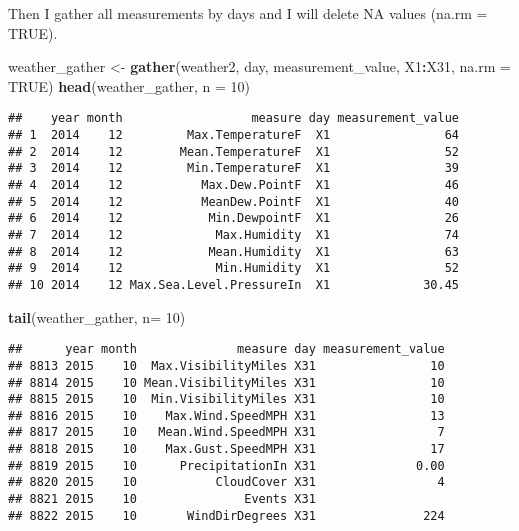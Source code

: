 \documentclass[
]{article}
\newenvironment{Shaded}{\begin{snugshade}}{\end{snugshade}}
\newcommand{\DataTypeTok}[1]{\textcolor[rgb]{0.13,0.29,0.53}{#1}}
\newcommand{\DecValTok}[1]{\textcolor[rgb]{0.00,0.00,0.81}{#1}}
\newcommand{\KeywordTok}[1]{\textcolor[rgb]{0.13,0.29,0.53}{\textbf{#1}}}
\newcommand{\NormalTok}[1]{#1}
\newcommand{\OperatorTok}[1]{\textcolor[rgb]{0.81,0.36,0.00}{\textbf{#1}}}
\newcommand{\OtherTok}[1]{\textcolor[rgb]{0.56,0.35,0.01}{#1}}
\newcommand{\StringTok}[1]{\textcolor[rgb]{0.31,0.60,0.02}{#1}}
\begin{document}
Then I gather all measurements by days and I will delete NA values
(na.rm = TRUE).

\begin{Shaded}
\begin{Highlighting}[]
\NormalTok{weather_gather <-}\StringTok{ }\KeywordTok{gather}\NormalTok{(weather2, day, measurement_value, X1}\OperatorTok{:}\NormalTok{X31, }\DataTypeTok{na.rm =} \OtherTok{TRUE}\NormalTok{)}
\KeywordTok{head}\NormalTok{(weather_gather, }\DataTypeTok{n =} \DecValTok{10}\NormalTok{)}
\end{Highlighting}
\end{Shaded}

\begin{verbatim}
##    year month                  measure day measurement_value
## 1  2014    12         Max.TemperatureF  X1                64
## 2  2014    12        Mean.TemperatureF  X1                52
## 3  2014    12         Min.TemperatureF  X1                39
## 4  2014    12           Max.Dew.PointF  X1                46
## 5  2014    12           MeanDew.PointF  X1                40
## 6  2014    12            Min.DewpointF  X1                26
## 7  2014    12             Max.Humidity  X1                74
## 8  2014    12            Mean.Humidity  X1                63
## 9  2014    12             Min.Humidity  X1                52
## 10 2014    12 Max.Sea.Level.PressureIn  X1             30.45
\end{verbatim}

\begin{Shaded}
\begin{Highlighting}[]
\KeywordTok{tail}\NormalTok{(weather_gather, }\DataTypeTok{n=} \DecValTok{10}\NormalTok{)}
\end{Highlighting}
\end{Shaded}

\begin{verbatim}
##      year month              measure day measurement_value
## 8813 2015    10  Max.VisibilityMiles X31                10
## 8814 2015    10 Mean.VisibilityMiles X31                10
## 8815 2015    10  Min.VisibilityMiles X31                10
## 8816 2015    10    Max.Wind.SpeedMPH X31                13
## 8817 2015    10   Mean.Wind.SpeedMPH X31                 7
## 8818 2015    10    Max.Gust.SpeedMPH X31                17
## 8819 2015    10      PrecipitationIn X31              0.00
## 8820 2015    10           CloudCover X31                 4
## 8821 2015    10               Events X31                  
## 8822 2015    10       WindDirDegrees X31               224
\end{verbatim}
\end{document}

